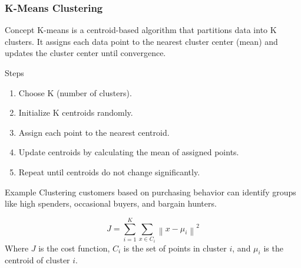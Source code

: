 \documentclass[aspectratio=169]{beamer}
\begin{document}
\begin{frame}[fragile]
    \frametitle{K-Means Clustering}
    \begin{block}{Concept}
        K-means is a centroid-based algorithm that partitions data into K clusters. It assigns each data point to the nearest cluster center (mean) and updates the cluster center until convergence.
    \end{block}
    
    \begin{block}{Steps}
        \begin{enumerate}
            \item Choose K (number of clusters).
            \item Initialize K centroids randomly.
            \item Assign each point to the nearest centroid.
            \item Update centroids by calculating the mean of assigned points.
            \item Repeat until centroids do not change significantly.
        \end{enumerate}
    \end{block}
    
    \begin{block}{Example}
        Clustering customers based on purchasing behavior can identify groups like high spenders, occasional buyers, and bargain hunters.
    \end{block}
    
    \begin{equation}
        J = \sum_{i=1}^{K} \sum_{x \in C_i} \left\| x - \mu_i \right\|^2
    \end{equation}
    Where $J$ is the cost function, $C_i$ is the set of points in cluster $i$, and $\mu_i$ is the centroid of cluster $i$.
\end{frame}
\end{document}
